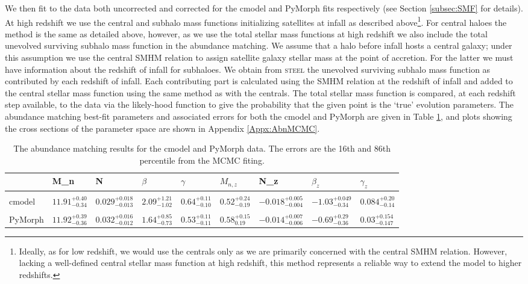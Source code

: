 We then fit to the \cite{Davidzon2017TheSnapshots} data both uncorrected and corrected for the cmodel and PyMorph fits respectively (see Section \ref{subsec:SMF} for details). At high redshift we use the central and subhalo mass functions initializing satellites at infall as described above\footnote{Ideally, as for low redshift, we would use the centrals only as we are primarily concerned with the central SMHM relation. However, lacking a well-defined central stellar mass function at high redshift, this method represents a reliable way to extend the model to higher redshifts.}. For central haloes the method is the same as detailed above, however, as we use the total stellar mass functions at high redshift we also include the total unevolved surviving subhalo mass function in the abundance matching. 
We assume that a halo before infall hosts a central galaxy; under this assumption we use the central SMHM relation to assign satellite galaxy stellar mass at the point of accretion. For the latter we must have information about the redshift of infall for subhaloes. We obtain from \textsc{steel} the unevolved surviving subhalo mass function as contributed by each redshift of infall. Each contributing part is calculated using the SMHM relation at the redshift of infall and added to the central stellar mass function using the same method as with the centrals. The total stellar mass function is compared, at each redshift step available, to the data via the likely-hood function to give the probability that the given point is the `true' evolution parameters. The abundance matching best-fit parameters and associated errors for both the cmodel and PyMorph are given in Table \ref{tab:AbnResult}, and plots showing the cross sections of the parameter space are shown in Appendix \ref{Appx:AbnMCMC}.

\begin{table}
\centering
\begin{tabular}{l|llllllll}
        & M\_n & N     & $\beta$ & $\gamma$ & $M_{n,z}$ & N\_z   & $\beta_z$ & $\gamma_z$ \\ \hline
\\
cmodel  & $11.91_{-0.34}^{+0.40}$ & $0.029_{-0.013}^{+0.018}$ & $2.09_{-1.02}^{+1.21}$    & $0.64_{-0.10}^{+0.11}$     & $0.52_{-0.19}^{+0.24}$       & $-0.018_{-0.004}^{+0.005}$ & $-1.03_{-0.34}^{+0.049}$     & $0.084_{-0.14}^{+0.20}$      \\
\\
PyMorph & $11.92_{-0.36}^{+0.39}$ & $0.032_{-0.012}^{+0.016}$ & $1.64_{-0.73}^{+0.85}$     & $0.53_{-0.11}^{+0.11}$     & $0.58_{0.19}^{+0.15}$        & $-0.014_{-0.006}^{+0.007}$ & $-0.69_{-0.36}^{+0.29}$      & $0.03_{-0.147}^{+0.154}$      
\end{tabular}
\caption{The abundance matching results for the cmodel and PyMorph data. The errors are the 16th and 86th percentile from the MCMC fiting.}
\label{tab:AbnResult}
\end{table}


